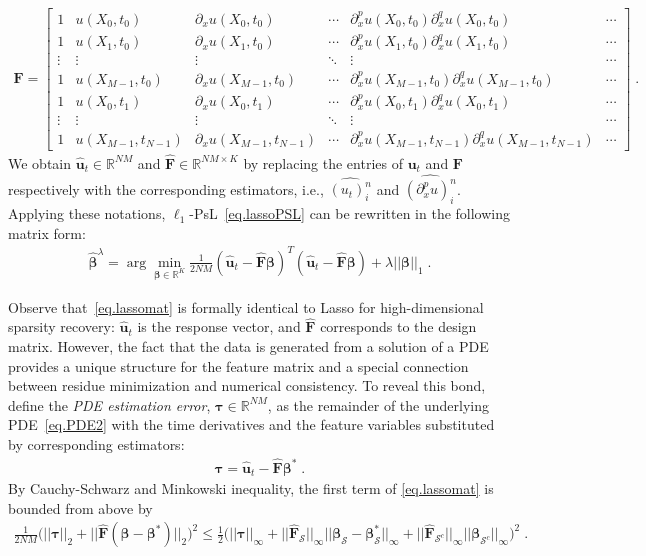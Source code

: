 \documentclass[a4paper,11pt]{article}
\newcommand{\btau}{\bm{\tau}}
\newcommand{\bbeta}{\bm{\beta}}
\newcommand{\bF}{\mathbf{F}}
\newcommand{\mS}{\mathcal{S}}
\newcommand{\bu}{\mathbf{u}}
\begin{document}
\begin{align}
\mathbf{F} =\begin{bmatrix}
 	1&u(X_0,t_0) & \partial_xu(X_0,t_0)  &\cdots& \partial^p_xu(X_0,t_0)\partial_x^qu(X_0,t_0) &\cdots\\
 	1&u(X_1,t_0) & \partial_xu(X_1,t_0)  &\cdots& \partial^p_xu(X_1,t_0)\partial_x^qu(X_1,t_0) &\cdots\\
 	\vdots&\vdots& \vdots&\ddots&\vdots&\cdots\\
 	1&u(X_{M-1},t_0) & \partial_xu(X_{M-1},t_0)  &\cdots& \partial^p_xu(X_{M-1},t_0)\partial_x^qu(X_{M-1},t_0) &\cdots\\
 	1&u(X_{0},t_1) & \partial_xu(X_{0},t_1)  &\cdots& \partial^p_xu(X_{0},t_1)\partial_x^qu(X_{0},t_1) &\cdots\\
 	\vdots&\vdots& \vdots&\ddots&\vdots&\cdots\\
 	1&u(X_{M-1},t_{N-1})&\partial_xu(X_{M-1},t_{N-1})&\cdots& \partial^p_xu(X_{M-1},t_{N-1})\partial_x^qu(X_{M-1},t_{N-1})  &\cdots
 	\end{bmatrix}\;.\label{def.featuremat}
\end{align}
We obtain $\widehat{\mathbf{u}}_t\in\mathbb{R}^{NM}$ and $\widehat{\mathbf{F}}\in\mathbb{R}^{NM\times K}$  by replacing the entries of $\mathbf{u}_t$ and $\mathbf{F}$ respectively with the corresponding estimators, i.e., $\widehat{(u_t)_i^n}$ and $\widehat{(\partial_x^pu)_i^n}$. Applying these notations, $\ell_1$-PsL~\eqref{eq.lassoPSL} can be rewritten in the following matrix form: 
\begin{align}
\widehat{\bbeta}^\lambda=\arg\min_{\bbeta\in\mathbb{R}^K}\frac{1}{2NM}(\widehat{\bu}_t-\widehat{\bF}\bbeta)^T(\widehat{\bu}_t-\widehat{\bF}\bbeta)+\lambda||\bbeta||_1\;.\label{eq.lassomat}
\end{align}

Observe that~\eqref{eq.lassomat} is formally identical to Lasso for high-dimensional sparsity recovery: $\widehat{\bu}_t$ is the response vector, and $\widehat{\bF}$ corresponds to the design matrix. However, the fact that the data is generated from a solution of a PDE provides a unique structure for the feature matrix and a special connection between residue minimization and numerical consistency. To reveal this bond, define the \textit{PDE estimation error}, $\btau\in\mathbb{R}^{NM}$, as the remainder of the underlying PDE~\eqref{eq.PDE2} with the time derivatives and the feature variables substituted by corresponding estimators:
\begin{align}
\btau=\widehat{\bu}_t-\widehat{\bF}\bbeta^*\;.\label{eq.tau}
\end{align}
By Cauchy-Schwarz and Minkowski inequality, the first term of \eqref{eq.lassomat} is bounded from above by
\begin{align}
\frac{1}{2NM}\big(||\btau||_2+||\widehat{\bF}(\bbeta-\bbeta^*)||_2\big)^2\leq \frac{1}{2}\big(||\btau||_\infty+||\widehat{\bF}_\mS||_\infty||\bbeta_\mS-\bbeta_\mS^*||_\infty+||\widehat{\bF}_{\mS^c}||_\infty||\bbeta_{\mS^c}||_\infty\big)^2\;.\label{eq.lassomat_tau}	
\end{align}
\end{document}
